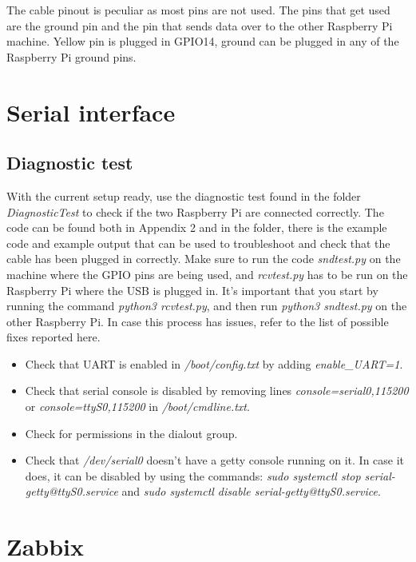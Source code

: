 \documentclass[a4paper,11pt]{scrartcl}
\begin{document}
The cable pinout is peculiar as most pins are not used. The pins that get used are the ground pin and the pin that sends data over to the other Raspberry Pi machine. Yellow pin is plugged in GPIO14, ground can be plugged in any of the Raspberry Pi ground pins.

\section{Serial interface}
\subsection{Diagnostic test}
With the current setup ready, use the diagnostic test found in the folder \textit{DiagnosticTest} to check if the two Raspberry Pi are connected correctly. The code can be found both in Appendix 2 and in the folder, there is the example code and example output that can be used to troubleshoot and check that the cable has been plugged in correctly. Make sure to run the code \textit{sndtest.py} on the machine where the GPIO pins are being used, and \textit{rcvtest.py} has to be run on the Raspberry Pi where the USB is plugged in. It's important that you start by running the command \textit{python3 rcvtest.py}, and then run \textit{python3 sndtest.py} on the other Raspberry Pi. In case this process has issues, refer to the list of possible fixes reported here.
\begin{itemize}
    \item Check that UART is enabled in \textit{/boot/config.txt} by adding \textit{enable\_UART=1}.
    \item Check that serial console is disabled by removing lines \textit{console=serial0,115200} or \textit{console=ttyS0,115200} in \textit{/boot/cmdline.txt}.
    \item Check for permissions in the dialout group.
    \item Check that \textit{/dev/serial0} doesn't have a getty console running on it. In case it does, it can be disabled by using the commands: \textit{sudo systemctl stop serial-getty@ttyS0.service} and \textit{sudo systemctl disable serial-getty@ttyS0.service}.
\end{itemize}


\section{Zabbix}
\end{document}
